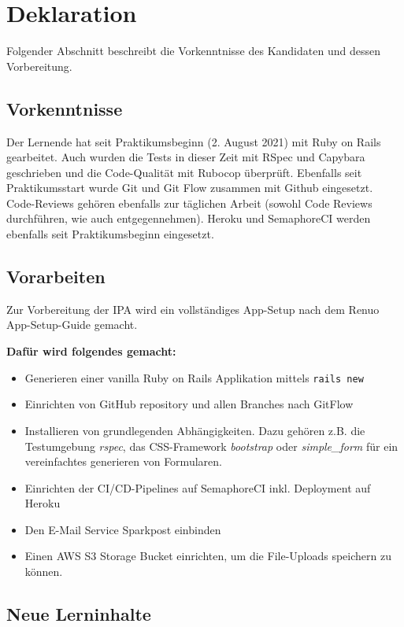 \chapter{Deklaration}

Folgender Abschnitt beschreibt die Vorkenntnisse des Kandidaten und dessen Vorbereitung.

\section{Vorkenntnisse}

Der Lernende hat seit Praktikumsbeginn (2. August 2021) mit Ruby on Rails gearbeitet. Auch wurden die Tests in dieser Zeit mit RSpec und Capybara geschrieben und die Code-Qualität mit Rubocop überprüft.
Ebenfalls seit Praktikumsstart wurde Git und Git Flow zusammen mit Github eingesetzt. Code-Reviews gehören ebenfalls zur täglichen Arbeit (sowohl Code Reviews durchführen, wie auch entgegennehmen).
Heroku und SemaphoreCI werden ebenfalls seit Praktikumsbeginn eingesetzt.

\section{Vorarbeiten}

Zur Vorbereitung der IPA wird ein vollständiges App-Setup nach dem Renuo App-Setup-Guide gemacht.

\textbf{Dafür wird folgendes gemacht:}
\begin{itemize}
    \item Generieren einer vanilla Ruby on Rails Applikation mittels \texttt{rails new}
    \item Einrichten von GitHub repository und allen Branches nach GitFlow
    \item Installieren von grundlegenden Abhängigkeiten. Dazu gehören z.B. die Testumgebung \emph{rspec},
          das CSS-Framework \emph{bootstrap} oder \emph{simple\_form} für ein vereinfachtes generieren von Formularen.
    \item Einrichten der CI/CD-Pipelines auf SemaphoreCI inkl. Deployment auf Heroku
    \item Den E-Mail Service Sparkpost einbinden
    \item Einen AWS S3 Storage Bucket einrichten, um die File-Uploads speichern zu können.
\end{itemize}

\section{Neue Lerninhalte}

